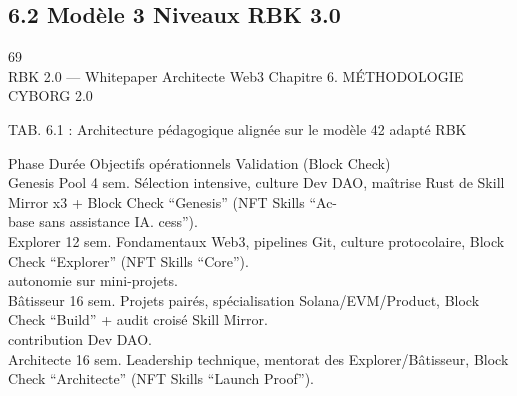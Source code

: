 \documentclass[12pt,landscape,a4paper]{article}
\begin{document}
\subsection{6.2 Modèle 3 Niveaux RBK 3.0}
\vspace{0.5em}
\vspace{0.5em}
\vspace{0.5em}
\vspace{0.5em}
69\\
RBK 2.0 — Whitepaper Architecte Web3                                                                   Chapitre 6. MÉTHODOLOGIE CYBORG 2.0\\
\vspace{0.5em}
\vspace{0.5em}
\vspace{0.5em}
\vspace{0.5em}
\begin{center}\begin{tabular}TAB. 6.1 : Architecture pédagogique alignée sur le modèle 42 adapté RBK\end{tabular}\end{center}
\vspace{0.5em}
\vspace{0.5em}
Phase                Durée     Objectifs opérationnels                                   Validation (Block Check)\\
Genesis Pool         4 sem.    Sélection intensive, culture Dev DAO, maîtrise Rust de    Skill Mirror x3 + Block Check “Genesis” (NFT Skills “Ac-\\
base sans assistance IA.                                  cess”).\\
Explorer             12 sem.   Fondamentaux Web3, pipelines Git, culture protocolaire,   Block Check “Explorer” (NFT Skills “Core”).\\
autonomie sur mini-projets.\\
Bâtisseur            16 sem.   Projets pairés, spécialisation Solana/EVM/Product,        Block Check “Build” + audit croisé Skill Mirror.\\
contribution Dev DAO.\\
Architecte           16 sem.   Leadership technique, mentorat des Explorer/Bâtisseur,    Block Check “Architecte” (NFT Skills “Launch Proof”).\\
\vspace{0.5em}
\vspace{0.5em}
\vspace{0.5em}
\vspace{0.5em}
\end{document}
